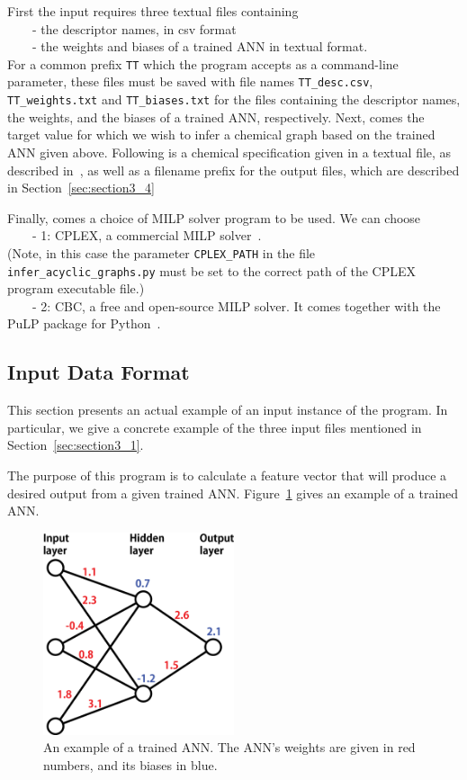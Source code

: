 \documentclass[11pt, titlepage, dvipdfmx, twoside]{article}
\begin{document}
First
the input requires three textual files containing \\
~~~~- the descriptor names, in csv format \\
~~~~- the weights and biases of a trained ANN in textual format.\\
For a common prefix {\tt TT} which the program accepts as a command-line parameter,
these files must be saved with file names {\tt TT\_desc.csv}, 
{\tt TT\_weights.txt} and {\tt TT\_biases.txt} for the files containing
the descriptor names, the weights, and the biases of a trained ANN, respectively.
%
Next, comes the target value for which we wish to infer 
a chemical graph based on the trained ANN given above.
Following is a chemical specification given in a textual file,
as described in~\cite{cyclic_BH_arxiv}, 
as well as a filename prefix for the output files,  which are described in Section~\ref{sec:section3_4}

Finally, comes a choice of MILP solver program to be used.
We can choose \\
~~~~- 1: CPLEX, a commercial MILP solver~\cite{cplex}. \\
(Note, in this case the parameter {\tt CPLEX\_PATH} in the file {\tt infer\_acyclic\_graphs.py}
must be set to the correct path of the CPLEX program executable file.) \\
~~~~- 2: CBC, a free and open-source MILP solver. 
It comes together with the PuLP package for Python~\cite{PuLP1}.




\subsection{Input Data Format}
\label{sec:section3_2}

This section presents an actual example of an input instance of the program.
In particular, we give a concrete example of the three input files
mentioned in Section~\ref{sec:section3_1}.

The purpose of this program is to calculate a feature vector that will produce a desired output from a 
given trained ANN.
Figure~\ref{fig:sample} gives an example of a trained ANN.


\begin{figure}[H]
  \centering
  \includegraphics[width=0.5\textwidth]{./fig/ANN_sample_en}
  \caption{An example of a trained ANN.
		      The ANN's weights are given in red numbers, and
		      its biases in blue.
		    }
  \label{fig:sample}
\end{figure}
\end{document}
